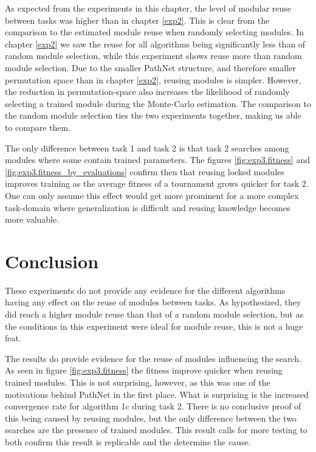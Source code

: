 As expected from the experiments in this chapter, the level of modular reuse between tasks was higher than in chapter \ref{exp2}. This is clear from the comparison to the estimated module reuse when randomly selecting modules. In chapter \ref{exp2} we saw the reuse for all algorithms being significantly less than of random module selection, while this experiment shows reuse more than random module selection. Due to the smaller PathNet structure, and therefore smaller permutation space than in chapter \ref{exp2}, reusing modules is simpler. However, the reduction in permutation-space also increases the likelihood of randomly selecting a trained module during the Monte-Carlo estimation. The comparison to the random module selection ties the two experiments together, making us able to compare them. 

The only difference between task 1 and task 2 is that task 2 searches among modules where some contain trained parameters. The figures \ref{fig:exp3.fitness} and \ref{fig:exp3.fitness_by_evaluations} confirm then that reusing locked modules improves training as the average fitness of a tournament grows quicker for task 2. One can only assume this effect would get more prominent for a more complex task-domain where generalization is difficult and reusing knowledge becomes more valuable. 

\section{Conclusion}
These experiments do not provide any evidence for the different algorithms having any effect on the reuse of modules between tasks. As hypothesized, they did reach a higher module reuse than that of a random module selection, but as the conditions in this experiment were ideal for module reuse, this is not a huge feat.

The results do provide evidence for the reuse of modules influencing the search. As seen in figure \ref{fig:exp3.fitness} the fitness improve quicker when reusing trained modules. This is not surprising, however, as this was one of the motivations behind PathNet in the first place. What is surprising is the increased convergence rate for algorithm 1c during task 2. There is no conclusive proof of this being caused by reusing modules, but the only difference between the two searches are the presence of trained modules. This result calls for more testing to both confirm this result is replicable and the determine the cause. 